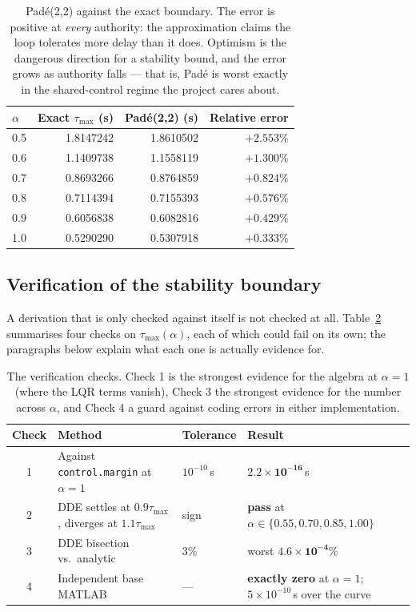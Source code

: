 \documentclass[11pt,a4paper]{article}
\theoremstyle{plain}
\theoremstyle{definition}
\begin{document}
\begin{table}[htbp]
\centering
\small
\begin{tabular}{@{}lrrr@{}}
\toprule
$\alpha$ & Exact $\tau_{\max}$ (s) & Pad\'e(2,2) (s) & Relative error \\
\midrule
0.5 & 1.8147242 & 1.8610502 & $+2.553\%$ \\
0.6 & 1.1409738 & 1.1558119 & $+1.300\%$ \\
0.7 & 0.8693266 & 0.8764859 & $+0.824\%$ \\
0.8 & 0.7114394 & 0.7155393 & $+0.576\%$ \\
0.9 & 0.6056838 & 0.6082816 & $+0.429\%$ \\
1.0 & 0.5290290 & 0.5307918 & $+0.333\%$ \\
\bottomrule
\end{tabular}
\caption{Pad\'e(2,2) against the exact boundary. The error is positive
at \emph{every} authority: the approximation claims the loop tolerates
more delay than it does. Optimism is the dangerous direction for a
stability bound, and the error grows as authority falls --- that is,
Pad\'e is worst exactly in the shared-control regime the project cares
about.}
\label{tab:pade}
\end{table}

\subsection{Verification of the stability boundary}
\label{sec:verification}

A derivation that is only checked against itself is not checked at all.
Table~\ref{tab:checks} summarises four checks on
$\tau_{\max}(\alpha)$, each of which could fail on its own; the
paragraphs below explain what each one is actually evidence for.

\begin{table}[htbp]
\centering
\small
\begin{tabular}{@{}clp{1.6cm}>{\raggedright\arraybackslash}p{5.0cm}@{}}
\toprule
Check & Method & Tolerance & Result \\
\midrule
1 & Against \texttt{control.margin} at $\alpha=1$ & $10^{-10}$\,s
  & $\mathbf{2.2\times10^{-16}}$\,s \\
2 & DDE settles at $0.9\tau_{\max}$, diverges at $1.1\tau_{\max}$ & sign
  & \textbf{pass} at $\alpha \in \{0.55, 0.70, 0.85, 1.00\}$ \\
3 & DDE bisection vs.\ analytic & $3\%$
  & worst $\mathbf{4.6\times10^{-4}\%}$ \\
4 & Independent base MATLAB & --- & \textbf{exactly zero} at
  $\alpha=1$; \mbox{$5\times10^{-10}$\,s} over the curve \\
\bottomrule
\end{tabular}
\caption{The verification checks. Check 1 is the strongest evidence for
the algebra at $\alpha = 1$ (where the LQR terms vanish), Check 3 the
strongest evidence for the number across $\alpha$, and Check 4 a guard
against coding errors in either implementation.}
\label{tab:checks}
\end{table}
\end{document}
